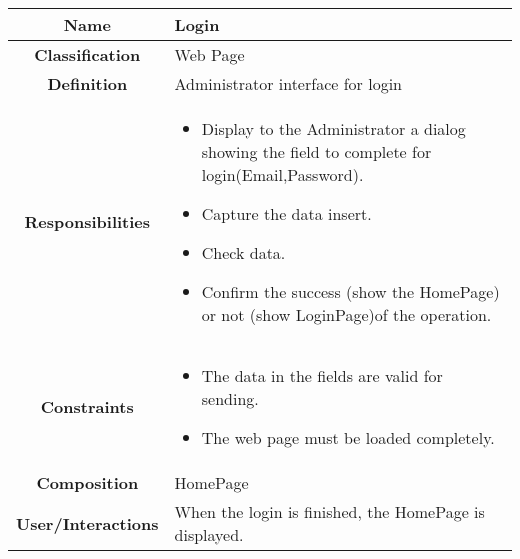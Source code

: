 \documentclass[11pt, a4paper,titlepage]{article}
\begin{document}
\begin{enumerate}
\begin{tabularx}{\textwidth}{| c | X |}
	\hline
	\textbf{Name} & 
	Login
	\\
	\hline
	\textbf{Classification} & 
	Web Page
	\\
	\hline
	\textbf{Definition} & 
	Administrator interface for login
	\\
	\hline
	\textbf{Responsibilities} &
	\begin{itemize}
		\item Display to the Administrator a dialog showing the field to     complete for login(Email,Password).
		\item  Capture the data insert.
		\item Check data.
		\item Confirm the success (show the HomePage) or not (show             LoginPage)of the operation.
	\end{itemize}
	\\
	\hline
	\textbf{Constraints} & 
	\begin{itemize}
		\item  The data in the fields are valid for sending.
		\item The web page must be loaded completely.
	\end{itemize}
	\\
	\hline
	\textbf{Composition} & 
	HomePage
	\\
	\hline
	\textbf{User/Interactions} & 
	When the login is finished, the HomePage is displayed.
	\\
	\hline	
\end{tabularx}


\end{enumerate}
\end{document}
